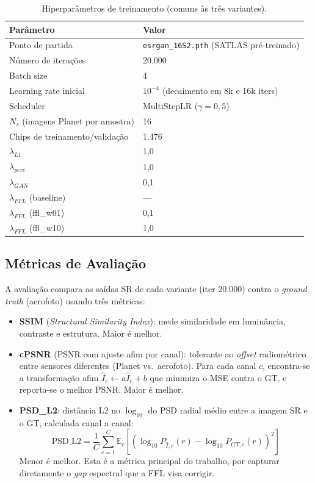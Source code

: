 \documentclass[12pt, a4paper]{article}
\begin{document}
\begin{table}[H]
\centering
\caption{Hiperparâmetros de treinamento (comuns às três variantes).}
\label{tab:config}
\begin{tabular}{ll}
\toprule
\textbf{Parâmetro} & \textbf{Valor} \\
\midrule
Ponto de partida & \texttt{esrgan\_16S2.pth} (SATLAS pré-treinado) \\
Número de iterações & 20.000 \\
Batch size & 4 \\
Learning rate inicial & $10^{-4}$ (decaimento em 8k e 16k iters) \\
Scheduler & MultiStepLR ($\gamma=0{,}5$) \\
$N_s$ (imagens Planet por amostra) & 16 \\
Chips de treinamento/validação & 1.476 \\
$\lambda_{L1}$ & 1{,}0 \\
$\lambda_{perc}$ & 1{,}0 \\
$\lambda_{GAN}$ & 0{,}1 \\
$\lambda_{FFL}$ (baseline) & --- \\
$\lambda_{FFL}$ (ffl\_w01) & 0{,}1 \\
$\lambda_{FFL}$ (ffl\_w10) & 1{,}0 \\
\bottomrule
\end{tabular}
\end{table}

\subsection{Métricas de Avaliação}

A avaliação compara as saídas SR de cada variante (iter 20.000) contra o
\textit{ground truth} (aerofoto) usando três métricas:

\begin{itemize}
    \item \textbf{SSIM} (\textit{Structural Similarity Index}): mede similaridade
    em luminância, contraste e estrutura. Maior é melhor.

    \item \textbf{cPSNR} (PSNR com ajuste afim por canal): tolerante ao
    \textit{offset} radiométrico entre sensores diferentes (Planet vs.\ aerofoto).
    Para cada canal $c$, encontra-se a transformação afim $\hat{I}_c \leftarrow a\hat{I}_c + b$
    que minimiza o MSE contra o GT, e reporta-se o melhor PSNR. Maior é melhor.

    \item \textbf{PSD\_L2}: distância L2 no $\log_{10}$ do PSD radial médio entre
    a imagem SR e o GT, calculada canal a canal:
    \begin{equation}
        \text{PSD\_L2} = \frac{1}{C}\sum_{c=1}^{C} \mathbb{E}_r\!\left[\left(\log_{10} P_{\hat{I},c}(r) - \log_{10} P_{GT,c}(r)\right)^2\right]
    \end{equation}
    Menor é melhor. Esta é a métrica principal do trabalho, por capturar
    diretamente o \textit{gap} espectral que a FFL visa corrigir.
\end{itemize}
\end{document}
